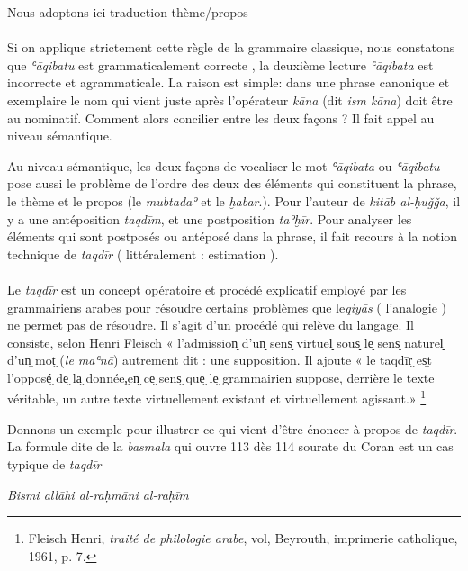 \documentclass[a4paper,12pt]{report}
\begin{document}
\begin{itemize}
\begin{enumerate}
{Nous adoptons ici  traduction thème/propos}
\paragraph{}
Si on applique strictement  cette règle de la grammaire classique, nous constatons que  \textit{ʿāqibatu} est grammaticalement correcte , la deuxième lecture \textit{ʿāqibata} est incorrecte et agrammaticale. La raison est simple: dans une phrase canonique et exemplaire le nom qui vient juste après l'opérateur \textit{ kāna} (dit \textit{ism kāna}) doit être au nominatif. Comment alors concilier entre les deux façons ? Il fait appel au niveau sémantique.

Au niveau sémantique,  les deux façons de vocaliser le mot \textit{ʿāqibata} ou \textit{ʿāqibatu} pose aussi le problème de l'ordre des deux des éléments qui constituent la phrase, le thème et le propos (le \textit{mubtadaʾ}  et  le \textit{ḫabar}.). Pour l'auteur de \textit{kitāb al-ḥuǧǧa},   il y a une antéposition \textit{taqd\=im},  et une postposition \textit{taʾḫīr}. Pour analyser les éléments qui sont postposés ou antéposé dans la phrase, il  fait  recours à  la notion technique de   \textit{taqdīr} ( littéralement : estimation ). 
\paragraph{}
Le \textit{taqdīr} est un concept opératoire et  procédé explicatif employé par les grammairiens arabes pour  résoudre certains problèmes que le\textit{qiyās} ( l'analogie ) ne permet pas de résoudre. Il s'agit d'un procédé qui relève du langage. Il consiste, selon Henri Fleisch « l’admission̬ d’un̬ sens̬ virtuel̬ sous̬ le̬ sens̬ naturel̬ d’un̬ mot̬ (\textit{le maʿnā}) autrement dit : une supposition. Il ajoute « le taqdīr̬ es̬t l’opposé̬ de̬ la̬ donnée,̬en̬ ce̬ sens̬ que̬ le̬ grammairien suppose, derrière le texte véritable, un autre texte virtuellement existant et virtuellement agissant.» \footnote {Fleisch Henri, \textit{traité de philologie arabe}, vol, Beyrouth, imprimerie catholique, 1961, p. 7. }

Donnons un exemple pour illustrer ce qui vient d'être énoncer à propos de \textit{taqd\=ir}. La formule dite de la \textit{basmala} qui ouvre  113  dès 114 sourate du Coran est un cas typique de \textit{taqd\=ir}


\begin{center}

\textit{Bismi allāhi al-raḥmāni al-raḥīm}


\end{center}
\end{enumerate}
\end{itemize}
\end{document}

